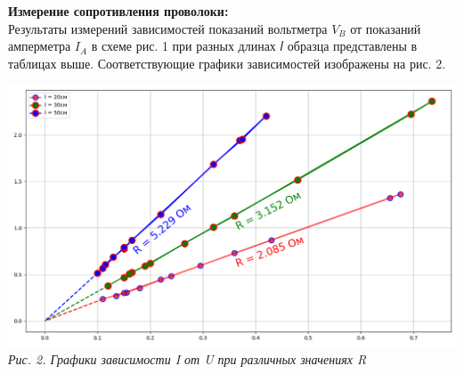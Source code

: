 \documentclass[12pt, a4paper]{article}
\begin{document}
    \textbf{Измерение сопротивления проволоки:} \\
    Результаты измерений зависимостей показаний вольтметра $V_B$ от показаний амперметра $𝐼_A$ в
    схеме рис. 1 при разных длинах 𝑙 образца представлены в таблицах выше. Соответствующие графики
    зависимостей изображены на рис. 2. \\

    \begin{minipage}[c]{1\textwidth}
        \begin{center}
            \includegraphics[scale=0.4]{Pics/1.1.1.png} \\
            \textit{\textcolor[HTML]{000000}{Рис. 2. Графики зависимости I от U при различных значениях R }}
        \end{center}
    \end{minipage}
    \vspace*{0.6cm}
\end{document}

